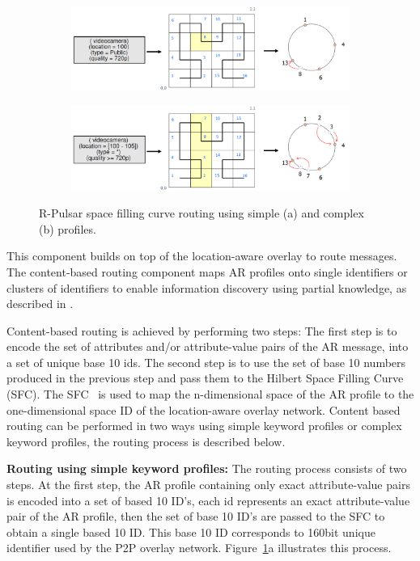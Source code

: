 \begin{figure}
\centering
\begin{subfigure}[b]{0.9\textwidth}
   \includegraphics[width=1\linewidth]{Figures/single.pdf}
   \caption{}
\end{subfigure}
\begin{subfigure}[b]{0.9\textwidth}
   \includegraphics[width=1\linewidth]{Figures/multi.pdf}
   \caption{}
\end{subfigure}
\caption{R-Pulsar space filling curve routing using simple (a) and complex (b) profiles.}\label{fig:routingProfiles} 
\end{figure}

This component builds on top of the location-aware overlay to route messages. The content-based routing component maps AR profiles onto single identifiers or clusters of identifiers to enable information discovery using partial knowledge, as described in \cite{SCHMIDT2008962}.

Content-based routing is achieved by performing two steps: The first step is to encode the set of attributes and/or attribute-value pairs of the AR message, into a set of unique base 10 ids. The second step is to use the set of base 10 numbers produced in the previous step and pass them to the Hilbert Space Filling Curve (SFC). The SFC~\cite{SFC} is used to map the n-dimensional space of the AR profile to the one-dimensional space ID of the location-aware overlay network. Content based routing can be performed in two ways using simple keyword profiles or complex keyword profiles, the routing process is described below.

\textbf{Routing using simple keyword profiles:} The routing process consists of two steps. At the first step, the AR profile containing only exact attribute-value pairs is encoded into a set of based 10 ID's, each id represents an exact attribute-value pair of the AR profile, then the set of base 10 ID's are passed to the SFC to obtain a single based 10 ID. This base 10 ID corresponds to 160bit unique identifier used by the P2P overlay network. Figure~\ref{fig:routingProfiles}a illustrates this process. \vspace{1ex} 

